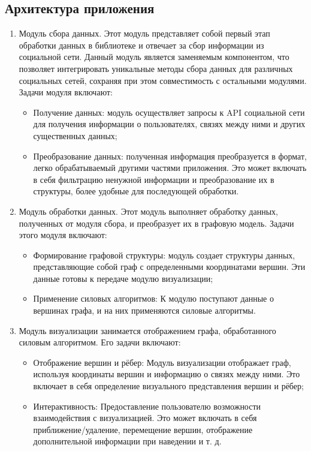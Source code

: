 \documentclass[14pt, russian]{scrartcl}
\begin{document}
\subsection{Архитектура приложения}


\begin{enumerate}
  \item{Модуль сбора данных.
    Этот модуль представляет собой первый этап обработки данных в библиотеке и отвечает за сбор информации из социальной сети. Данный модуль является заменяемым компонентом, что позволяет интегрировать уникальные методы сбора данных для различных социальных сетей, сохраняя при этом совместимость с остальными модулями. Задачи модуля включают:
    \begin{itemize}
      \item{Получение данных: модуль осуществляет запросы к API социальной сети для получения информации о пользователях, связях между ними и других существенных данных;}
      \item{Преобразование данных: полученная информация преобразуется в формат, легко обрабатываемый другими частями приложения. Это может включать в себя фильтрацию ненужной информации            и преобразование их в структуры, более удобные для последующей обработки.}
    \end{itemize}
    }
  \item{Модуль обработки данных.
    Этот модуль выполняет обработку данных, полученных от модуля сбора, и преобразует их в графовую модель. Задачи этого модуля включают:

    \begin{itemize}
      \item Формирование графовой структуры: модуль создает структуры данных, представляющие собой граф с определенными координатами вершин. Эти данные готовы к передаче модулю визуализации;
      \item Применение силовых алгоритмов: К модулю поступают данные о вершинах графа, и на них применяются силовые алгоритмы.
    \end{itemize}


    }
  \item{Модуль визуализации занимается отображением графа, обработанного силовым алгоритмом. Его задачи включают:

    \begin{itemize}
      \item Отображение вершин и рёбер: Модуль визуализации отображает граф, используя координаты вершин и информацию о связях между ними. Это включает в себя определение визуального представления вершин и рёбер;
      \item Интерактивность: Предоставление пользователю возможности взаимодействия с визуализацией. Это может включать в себя приближение/удаление, перемещение вершин, отображение дополнительной информации при наведении и т. д.
    \end{itemize}
    }

\end{enumerate}
\end{document}
